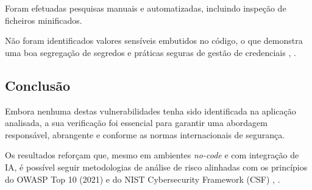Foram efetuadas pesquisas manuais e automatizadas, incluindo inspeção de ficheiros minificados.

Não foram identificados valores sensíveis embutidos no código, o que demonstra uma boa segregação de segredos e práticas seguras de gestão de credenciais \cite{ref14}, \cite{ref15}.

\subsection{Conclusão}

Embora nenhuma destas vulnerabilidades tenha sido identificada na aplicação analisada, a sua verificação foi essencial para garantir uma abordagem responsável, abrangente e conforme as normas internacionais de segurança.

Os resultados reforçam que, mesmo em ambientes \textit{no-code} e com integração de IA, é possível seguir metodologias de análise de risco alinhadas com os princípios do OWASP Top 10 (2021) e do NIST Cybersecurity Framework (CSF) \cite{ref2}, \cite{ref4}.
